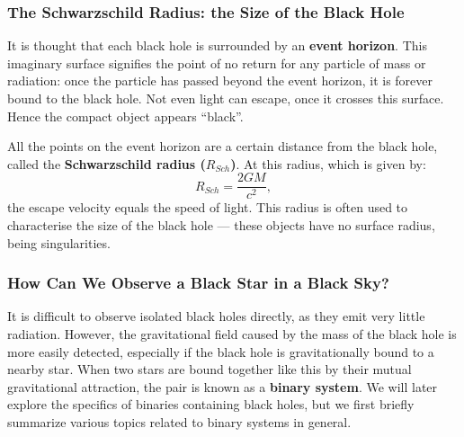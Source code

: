 
\subsubsection{The Schwarzschild Radius: the Size of the Black Hole}\label{cha:Introduction:sec:BlackHoles:subsubsec:EventHorizon}

It is thought that each black hole is surrounded by an \textbf{event
horizon}. This imaginary surface signifies the point of no return for any particle of mass
or radiation: once the particle has passed beyond the event horizon,
it is forever bound to the black hole. Not even light can escape, once it crosses this surface. Hence the compact object appears ``black''. %

\vspace{\myparskip}

All the points on the event horizon are a certain distance from the black hole, called the
\textbf{Schwarzschild radius ($R_{Sch}$)}. %
At this radius, which is given by:
\begin{equation}\label{cha:Introduction:sec:BlackHoles:eqn:R_Sch}
R_{Sch} = \frac{2 G M}{c^2},
\end{equation}
the escape velocity equals the speed of light. This radius is often used to characterise the size of the black hole --- these objects have no surface radius, being singularities. %


\subsubsection{How Can We Observe a Black Star in a Black Sky?}\label{cha:Introduction:sec:BlackHoles:subsubsec:HowCanWeObserveABlackStarInABlackSky}

It is difficult to observe isolated black holes directly, as they emit
very little radiation. However, the gravitational field caused by the mass of
the black hole is more easily detected, especially if the black hole
is gravitationally bound to a nearby star. When two stars are bound
together like this by their mutual gravitational attraction, the pair is known
as a \textbf{binary system}. We will later explore the specifics of
binaries containing black holes, but we first briefly summarize various topics
related to binary systems in general. %

